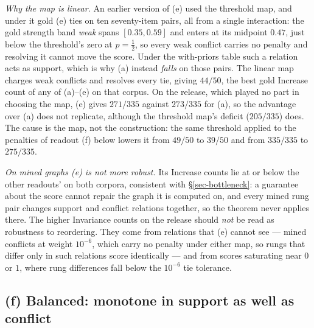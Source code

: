 \emph{Why the map is linear.} An earlier version of (e) used the threshold map, and under it gold
(e) ties on ten seventy-item pairs, all from a single interaction: the gold strength band \emph{weak}
spans $[0.35,0.59]$ and enters at its midpoint $0.47$, just below the threshold's zero at
$p=\tfrac12$, so every weak conflict carries no penalty and resolving it cannot move the score.
Under the with-priors table such a relation acts as support, which is why (a) instead \emph{falls}
on those pairs. The linear map charges weak conflicts and resolves every tie, giving $44/50$, the
best gold Increase count of any of (a)--(e) on that corpus. On the release, which played no part
in choosing the map, (e) gives $271/335$ against $273/335$ for (a), so the advantage over (a)
does not replicate, although the threshold map's deficit ($205/335$) does. The cause is the map, not
the construction: the same threshold applied to the penalties of readout (f) below lowers it from
$49/50$ to $39/50$ and from $335/335$ to $275/335$.

\emph{On mined graphs (e) is not more robust.} Its Increase counts lie at or below the other
readouts' on both corpora, consistent with \S\ref{sec-bottleneck}: a guarantee about the score cannot
repair the graph it is computed on, and every mined rung pair changes support and conflict relations
together, so the theorem never applies there. The higher Invariance counts on the release should
\emph{not} be read as robustness to reordering. They come from relations that (e) cannot see ---
mined conflicts at weight $10^{-6}$, which carry no penalty under either map, so rungs that differ
only in such relations score identically --- and from scores saturating near $0$ or $1$, where rung
differences fall below the $10^{-6}$ tie tolerance.

\subsection{(f) Balanced: monotone in support as well as conflict}
\label{sec-balanced}

